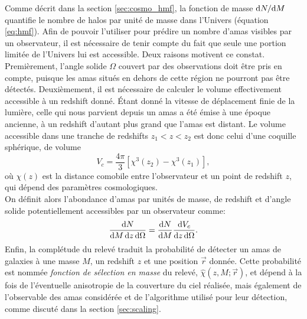 Comme décrit dans la section \ref{sec:cosmo_hmf}, la fonction de masse $\mathrm{d} N / \mathrm{d} M$ quantifie le nombre de halos par unité de masse dans l'Univers (équation \ref{eq:hmf}).
Afin de pouvoir l'utiliser pour prédire un nombre d'amas visibles par un observateur, il est nécessaire de tenir compte du fait que seule une portion limitée de l'Univers lui est accessible.
Deux raisons motivent ce constat.
Premièrement, l'angle solide $\Omega$ couvert par des observations doit être pris en compte, puisque les amas situés en dehors de cette région ne pourront pas être détectés.
Deuxièmement, il est nécessaire de calculer le volume effectivement accessible à un redshift donné.
Étant donné la vitesse de déplacement finie de la lumière, celle qui nous parvient depuis un amas a été émise à une époque ancienne, à un redshift d'autant plus grand que l'amas est distant.
Le volume accessible dans une tranche de redshifts $z_1 < z < z_2$ est donc celui d'une coquille sphérique, de volume
\begin{equation}
    V_c = \frac{4\pi}{3}\left[\chi^3(z_2) - \chi^3(z_1)\right],
\end{equation}
où $\chi(z)$ est la distance comobile entre l'observateur et un point de redshift $z$, qui dépend des paramètres cosmologiques. \\
On définit alors l'abondance d'amas par unités de masse, de redshift et d'angle solide potentiellement accessibles par un observateur comme:
\begin{equation}
    \label{eq:hmf_comoving}
    \frac{\mathrm{d} N}{\mathrm{d} M \, \mathrm{d} z \, \mathrm{d}\Omega} = \frac{\mathrm{d} N}{\mathrm{d} M} \frac{\mathrm{d} V_c}{\mathrm{d} z \, \mathrm{d}\Omega}.
\end{equation}
Enfin, la complétude du relevé traduit la probabilité de détecter un amas de galaxies à une masse $M$, un redshift $z$ et une position $\vec{r}$ donnée.
Cette probabilité est nommée \textit{fonction de sélection en masse} du relevé, $\hat{\chi}(z, M; \vec{r})$, et dépend à la fois de l'éventuelle anisotropie de la couverture du ciel réalisée, mais également de l'observable des amas considérée et de l'algorithme utilisé pour leur détection, comme discuté dans la section \ref{sec:scaling}.

